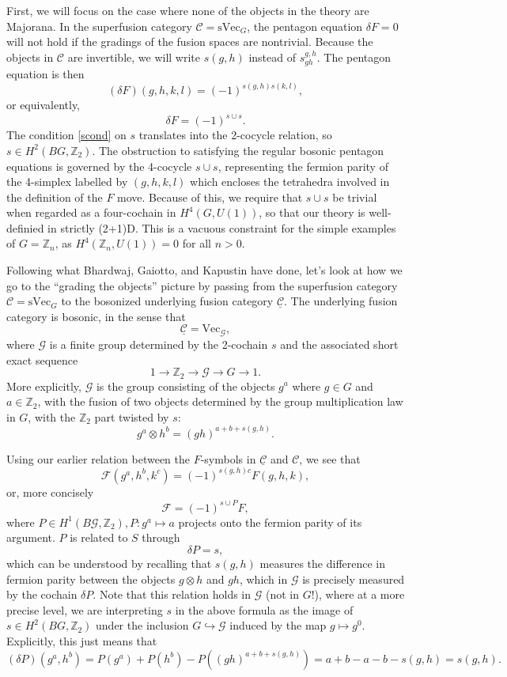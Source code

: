 \documentclass[12pt,a4paper]{article}
\newcommand{\tp}{\otimes}
\newcommand{\ra}{\rightarrow}
\newcommand{\zz}{\mathbb{Z}}
\newcommand{\mcg}{\mathcal{G}}
\newcommand{\ulmcc}{\underline{\mathcal{C}}}
\newcommand{\zt}{\mathbb{Z}_2}
\newcommand\be            {\begin{equation}}
\newcommand\ee            {\end{equation}}
\newcommand{\mcf}{\mathcal{F}}
\newcommand{\mcc}{\mathcal{C}}
\newcommand{\vect}{\text{Vec}}
\newcommand{\svect}{\text{sVec}}
\begin{document}
First, we will focus on the case where none of the objects in the theory are Majorana. 
In the superfusion category $\mcc = \svect_G$, the pentagon equation $\delta F = 0$ will not hold if the gradings of the fusion spaces are nontrivial. Because the objects in $\mcc$ are invertible, we will write $s(g,h)$ instead of $s^{g,h}_{gh}$. The pentagon equation is then 
\be (\delta F)(g,h,k,l) = (-1)^{s(g,h)s(k,l)},\ee
or equivalently,%
\be \delta F= (-1)^{s \cup s}.\ee
The condition \eqref{scond} on $s$ translates into the 2-cocycle relation, so $s\in H^2(BG,\zt)$. 
The obstruction to satisfying the regular 
bosonic pentagon equations is governed by the 4-cocycle $s\cup s$, representing the 
fermion parity of the 4-simplex labelled by $(g,h,k,l)$ which encloses the tetrahedra involved in the definition of the $F$ move. Because of this, we require that $s\cup s$ be trivial when regarded as a four-cochain in $H^4(G,U(1))$, so that our theory is well-definied in strictly (2+1)D. This is a vacuous constraint for the simple examples of $G = \zz_n$, as $H^4(\zz_n,U(1)) = 0$ for all $n > 0$. 

Following what Bhardwaj, Gaiotto, and Kapustin have done, let's look at how we go to the ``grading the objects'' picture by passing from the superfusion category $\mcc = \svect_G$ to the bosonized underlying fusion category $\ulmcc$. The underlying fusion category is bosonic, in the sense that 
\be \ulmcc  = \vect_\mcg,\ee
where $\mcg$ is a finite group determined by the 2-cochain $s$ and the associated short exact sequence 
\be 1 \ra \zt \ra \mcg \ra G \ra 1.\ee
More explicitly, $\mcg$ is the group consisting of the objects $g^a$ where $g\in G$ and $a\in \zt$, with the fusion of two objects determined by the group multiplication law in $G$, with the $\zt$ part twisted by $s$:
\be g^a \tp h^b = (gh)^{a + b + s(g,h)}.\ee

Using our earlier relation between the $F$-symbols in $\ulmcc$ and $\mcc$, we see that 
\be \mcf(g^a,h^b,k^c) = (-1)^{s(g,h)c}F(g,h,k),\ee
or, more concisely
\be \mcf = (-1)^{s\cup P}F,\ee
where $P \in H^1(B\mcg,\zt), P: g^a \mapsto a$ projects onto the
fermion parity of its argument. $P$ is related to $S$ through 
\be \delta P = s,\ee
which can be understood by recalling that $s(g,h)$ measures the difference in fermion parity between the objects $g\tp h$ and $gh$, 
which in $\mcg$ is precisely measured by the cochain $\delta P$. Note that this relation holds in $\mcg$ (not in $G$!), where
at a more precise level, we are interpreting $s$ in the above formula as the image of $s \in H^2(BG,\zt)$ under
the inclusion $G \hookrightarrow \mcg$ induced by the map $g \mapsto g^0$. Explicitly, this just means that $(\delta P)(g^a,h^b) = P(g^a) + P(h^b) - P((gh)^{a+b+s(g,h)}) = a + b - a -b - s(g,h) = s(g,h).$
\end{document}
